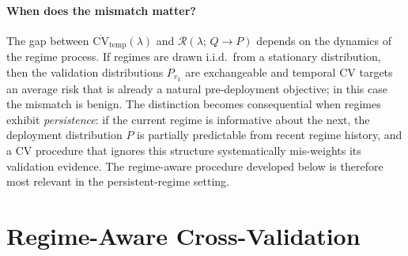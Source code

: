 \documentclass[11pt]{article}
\newcommand{\cR}{\mathcal{R}}
\begin{document}
\paragraph{When does the mismatch matter?}
The gap between $\overline{\mathrm{CV}}_{\mathrm{temp}}(\lambda)$ and
$\cR(\lambda;\,Q\to P)$ depends on the dynamics of the regime process.
If regimes are drawn i.i.d.\ from a stationary distribution, then
the validation distributions $P_{v_k}$ are exchangeable and temporal CV
targets an average risk that is already a natural pre-deployment objective;
in this case the mismatch is benign.
The distinction becomes consequential when regimes exhibit
\emph{persistence}: if the current regime is informative about the next,
the deployment distribution $P$ is partially predictable from recent
regime history, and a CV procedure that ignores this structure
systematically mis-weights its validation evidence.
The regime-aware procedure developed below is therefore most relevant in
the persistent-regime setting.


\section{Regime-Aware Cross-Validation}
\end{document}
